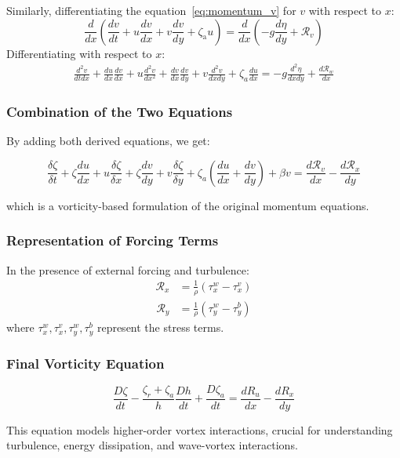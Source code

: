 \documentclass[a4paper,12pt]{article}
\begin{document}
    Similarly, differentiating the equation~\ref{eq:momentum_v} for $v$ with respect to $x$:
    \begin{equation*}
        \frac{d}{dx} \left( \frac{d v}{d t}+u \frac{d v}{d x}+v \frac{d v}{d y}+\zeta_{\text {a}} u \right) =  \frac{d}{dx} \left( -g
                                                                                                                                 \frac{d \eta}{d y}+\mathcal{R}_v \right)
        \label{eq:diff_v_to_x}
    \end{equation*}
    Differentiating with respect to $x$:
    \begin{align}
        \frac{d^2 v}{d t d x}+\frac{d u}{d x} \frac{d v}{d x}+u \frac{d^2 v}{d x^2}+\frac{d v}{d x} \frac{d v}{d y}+v \frac{d^2 v}{d x d y}+\zeta_a \frac{d u}{d x}=-g \frac{d^2 \eta}{d x d y}+\frac{d \mathcal{R}_w}{d x}
    \end{align}

    \subsubsection*{Combination of the Two Equations}
    By adding both derived equations, we get:
    \begin{eqbox}
        \begin{equation}
        \frac{\delta \zeta}{\delta t}+\zeta \frac{d u}{d x}+u \frac{\delta \zeta}{\delta x}+\zeta \frac{d v}{d y}+v \frac{\delta \zeta}{\delta y}+\zeta_a\left(\frac{d u}{d x}+\frac{d v}{d y}\right)+\beta v=\frac{d \mathcal{R}_v}{d x}-\frac{d \mathcal{R}_x}{d y}
        \end{equation}
    \end{eqbox}
    which is a vorticity-based formulation of the original momentum equations.

    \subsubsection*{Representation of Forcing Terms}
    In the presence of external forcing and turbulence:
    \begin{align}
        \mathcal{R}_x &= \frac{1}{\rho}(\tau_x^w - \tau_x^v)
    \end{align}
    \begin{align}
        \mathcal{R}_y &= \frac{1}{\rho}(\tau_y^w - \tau_y^b)
    \end{align}
    where $\tau_x^w, \tau_x^v, \tau_y^w, \tau_y^b$ represent the stress terms.

    \subsubsection{Final Vorticity Equation}
    \begin{eqbox}
        \begin{equation}
        \frac{D \zeta}{d t}-\frac{\zeta_r+\zeta_a}{h} \frac{D h}{d t}+\frac{D \zeta_a}{d t}=\frac{d R_u}{d x}-\frac{d R_x}{d y}
        \end{equation}
    \end{eqbox}
    This equation models higher-order vortex interactions, crucial for understanding turbulence, energy dissipation, and wave-vortex interactions.
\end{document}
